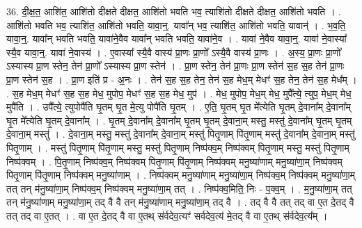 \documentclass[17pt]{extarticle}
\begin{document}
36. दी॒क्ष॒त॒ आशि॑त॒ आशि॑तो दीक्षते दीक्षत॒ आशि॑तो भवति भव॒ त्याशि॑तो दीक्षते दीक्षत॒ आशि॑तो भवति । . आशि॑तो भवति भव॒ त्याशि॑त॒ आशि॑तो भवति॒ यावा॒न्॒. यावा᳚न् भव॒ त्याशि॑त॒ आशि॑तो भवति॒ यावान्॑ । . भ॒व॒ति॒ यावा॒न्॒. यावा᳚न् भवति भवति॒ यावा॑ने॒वैव यावा᳚न् भवति भवति॒ यावा॑ने॒व । . यावा॑ ने॒वैव यावा॒न्॒. यावा॑ ने॒वास्या᳚ स्यै॒व यावा॒न्॒. यावा॑ ने॒वास्य॑ । . ए॒वास्या᳚ स्यै॒वै वास्य॑ प्रा॒णः प्रा॒णो᳚ ऽस्यै॒वै वास्य॑ प्रा॒णः । . अ॒स्य॒ प्रा॒णः प्रा॒णो᳚ ऽस्यास्य प्रा॒ण स्तेन॒ तेन॑ प्रा॒णो᳚ ऽस्यास्य प्रा॒ण स्तेन॑ । . प्रा॒ण स्तेन॒ तेन॑ प्रा॒णः प्रा॒ण स्तेन॑ स॒ह स॒ह तेन॑ प्रा॒णः प्रा॒ण स्तेन॑ स॒ह । . प्रा॒ण इति॑ प्र - अ॒नः । . तेन॑ स॒ह स॒ह तेन॒ तेन॑ स॒ह मेध॒म् मेधꣳ॑ स॒ह तेन॒ तेन॑ स॒ह मेध᳚म् । . स॒ह मेध॒म् मेधꣳ॑ स॒ह स॒ह मेध॒ मुपोप॒ मेधꣳ॑ स॒ह स॒ह मेध॒ मुप॑ । . मेध॒ मुपोप॒ मेध॒म् मेध॒ मुपै᳚त्ये॒ त्युप॒ मेध॒म् मेध॒ मुपै॑ति । . उपै᳚त्ये॒ त्युपोपै॑ति घृ॒तम् घृ॒त मे॒त्यु पोपै॑ति घृ॒तम् । . ए॒ति॒ घृ॒तम् घृ॒त मे᳚त्येति घृ॒तम् दे॒वाना᳚म् दे॒वाना᳚म् घृ॒त मे᳚त्येति घृ॒तम् दे॒वाना᳚म् । . घृ॒तम् दे॒वाना᳚म् दे॒वाना᳚म् घृ॒तम् घृ॒तम् दे॒वाना॒म् मस्तु॒ मस्तु॑ दे॒वाना᳚म् घृ॒तम् घृ॒तम् दे॒वाना॒म् मस्तु॑ । . दे॒वाना॒म् मस्तु॒ मस्तु॑ दे॒वाना᳚म् दे॒वाना॒म् मस्तु॑ पितृ॒णाम् पि॑तृ॒णाम् मस्तु॑ दे॒वाना᳚म् दे॒वाना॒म् मस्तु॑ पितृ॒णाम् । . मस्तु॑ पितृ॒णाम् पि॑तृ॒णाम् मस्तु॒ मस्तु॑ पितृ॒णाम् निष्प॑क्व॒म् निष्प॑क्वम् पितृ॒णाम् मस्तु॒ मस्तु॑ पितृ॒णाम् निष्प॑क्वम् । . पि॒तृ॒णाम् निष्प॑क्व॒म् निष्प॑क्वम् पितृ॒णाम् पि॑तृ॒णाम् निष्प॑क्वम् मनु॒ष्या॑णाम् मनु॒ष्या॑णा॒म् निष्प॑क्वम् पितृ॒णाम् पि॑तृ॒णाम् निष्प॑क्वम् मनु॒ष्या॑णाम् । . निष्प॑क्वम् मनु॒ष्या॑णाम् मनु॒ष्या॑णा॒म् निष्प॑क्व॒म् निष्प॑क्वम् मनु॒ष्या॑णा॒म् तत् तन् म॑नु॒ष्या॑णा॒म् निष्प॑क्व॒म् निष्प॑क्वम् मनु॒ष्या॑णा॒म् तत् । . निष्प॑क्व॒मिति॒ निः - प॒क्व॒म् । . म॒नु॒ष्या॑णा॒म् तत् तन् म॑नु॒ष्या॑णाम् मनु॒ष्या॑णा॒म् तद् वै वै तन् म॑नु॒ष्या॑णाम् मनु॒ष्या॑णा॒म् तद् वै । . तद् वै वै तत् तद् वा ए॒त दे॒तद् वै तत् तद् वा ए॒तत् । . वा ए॒त दे॒तद् वै वा ए॒तथ् स॑र्वदेव॒त्यꣳ॑ सर्वदेव॒त्य॑ मे॒तद् वै वा ए॒तथ् स॑र्वदेव॒त्य᳚म् । \newline
\pagebreak
{}
\end{document}
